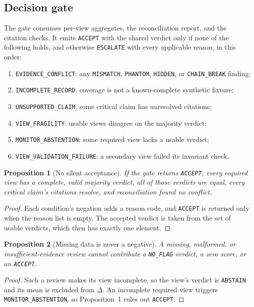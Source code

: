 \documentclass[11pt]{article}
\newtheorem{proposition}{Proposition}
\newcommand{\code}[1]{\texttt{#1}}
\begin{document}
\subsection{Decision gate}

The gate consumes per-view aggregates, the reconciliation report, and the citation checks. It emits \code{ACCEPT} with the shared verdict only if none of the following holds, and otherwise \code{ESCALATE} with every applicable reason, in this order:
\begin{enumerate}
\item \code{EVIDENCE\_CONFLICT}: any \code{MISMATCH}, \code{PHANTOM}, \code{HIDDEN}, or \code{CHAIN\_BREAK} finding;
\item \code{INCOMPLETE\_RECORD}: coverage is not a known-complete synthetic fixture;
\item \code{UNSUPPORTED\_CLAIM}: some critical claim has unresolved citations;
\item \code{VIEW\_FRAGILITY}: usable views disagree on the majority verdict;
\item \code{MONITOR\_ABSTENTION}: some required view lacks a usable verdict;
\item \code{VIEW\_VALIDATION\_FAILURE}: a secondary view failed its invariant check.
\end{enumerate}

\begin{proposition}[No silent acceptance]
If the gate returns \code{ACCEPT}, every required view has a complete, valid majority verdict, all of those verdicts are equal, every critical claim's citations resolve, and reconciliation found no conflict.
\end{proposition}
\begin{proof}
Each condition's negation adds a reason code, and \code{ACCEPT} is returned only when the reason list is empty. The accepted verdict is taken from the set of usable verdicts, which then has exactly one element.
\end{proof}

\begin{proposition}[Missing data is never a negative]
A missing, malformed, or insufficient-evidence review cannot contribute a \code{NO\_FLAG} verdict, a zero score, or an \code{ACCEPT}.
\end{proposition}
\begin{proof}
Such a review makes its view incomplete, so the view's verdict is \code{ABSTAIN} and its mean is excluded from $\Delta$. An incomplete required view triggers \code{MONITOR\_ABSTENTION}, so Proposition~1 rules out \code{ACCEPT}.
\end{proof}
\end{document}

